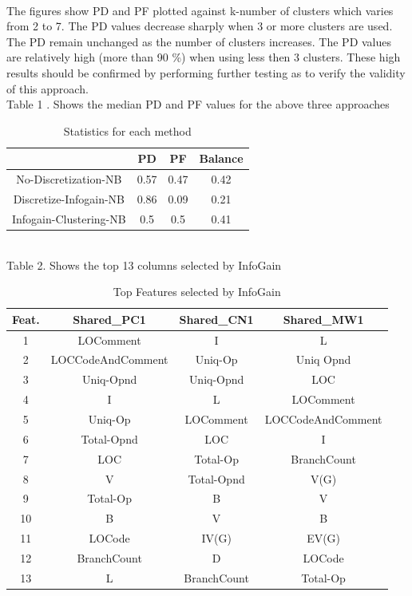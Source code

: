 \documentclass{sig-alternate}
\begin{document}
\\The figures show PD and PF plotted against k-number of clusters which varies from 2 to 7. The PD values decrease sharply when 3 or more clusters are used. The PD remain unchanged as the number of clusters increases. The PD values are relatively high (more than 90 \%) when using less then 3 clusters. These high results should be confirmed by performing further testing as to verify the validity of this approach. 
\\Table 1 . Shows the median PD and PF values for the above three approaches

\begin{table}
\centering
\caption{Statistics for each method}
\begin{tabular}{|c|c|c|c|} \hline
 &PD&PF&Balance\\\hline
No-Discretization-NB& 0.57 & 0.47 & 0.42 \\ \hline
Discretize-Infogain-NB& 0.86 & 0.09 & 0.21 \\ \hline
Infogain-Clustering-NB& 0.5  &0.5  & 0.41 \\ \hline
\end{tabular}
\end{table}

\\Table  2. Shows the top 13 columns selected by InfoGain

\begin{table}
\centering
\caption{Top Features selected by InfoGain}
\begin{tabular}{|c|c|c|c|} \hline
Feat.&Shared_PC1&Shared_CN1&Shared_MW1\\\hline
1& LOComment & I & L\\ \hline
2& LOCCodeAndComment & Uniq-Op & Uniq Opnd\\ \hline
3& Uniq-Opnd & Uniq-Opnd & LOC\\ \hline
4&  I & L & LOComment\\ \hline
5& Uniq-Op & LOComment & LOCCodeAndComment\\ \hline
6& Total-Opnd & LOC & I\\ \hline
7& LOC & Total-Op & BranchCount\\ \hline
8& V & Total-Opnd & V(G)\\ \hline
9& Total-Op & B & V\\ \hline
10& B & V & B\\ \hline
11& LOCode & IV(G) & EV(G)\\ \hline
12& BranchCount & D & LOCode\\ \hline
13& L & BranchCount & Total-Op\\ \hline

\hline\end{tabular}
\end{table}
\end{document}
